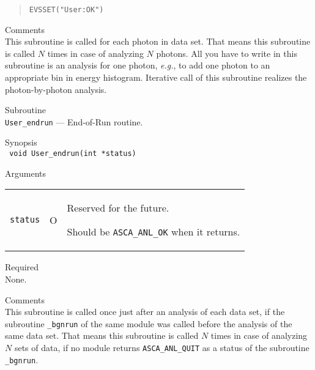 \begin{description}
\begin{quote}\baselineskip 3.2mm\begin{verbatim}
EVSSET("User:OK")
\end{verbatim}\end{quote}
\item{Comments} \\
   This subroutine is called for each photon in data set.
   That means
   this subroutine is called $N$ times
   in case of analyzing $N$ photons.
   All you have to write in this subroutine
   is an analysis for one photon,
   {\em e.g.},
   to add one photon to an appropriate bin in energy histogram.
   Iterative call of this subroutine realizes the photon-by-photon analysis.
\end{description}

\vspace{1cm}

\newpage
\begin{description}
\item{Subroutine}\\
   {\tt User\_endrun} --- End-of-Run routine.
\item{Synopsis}\\
   {\tt
      void User\_endrun(int *status)
   }
\item{Arguments} \\
 \begin{tabular}{l@{\ (}c@{)\ }p{}}
   {\tt status} & O & Reserved for the future.\par
                      Should be {\tt ASCA\_ANL\_OK} when it returns.
 \end{tabular}
\item{Required} \\
   None.
\item{Comments} \\
   This subroutine is called once
   just after an analysis of each data set,
   if the subroutine {\tt *\_bgnrun} of the same module was called
   before the analysis of the same data set.
   That means
   this subroutine is called $N$ times
   in case of analyzing $N$ sets of data,
   if no module returns {\tt ASCA\_ANL\_QUIT}
   as a status of the subroutine {\tt *\_bgnrun}.
\end{description}

\vspace{1cm}

